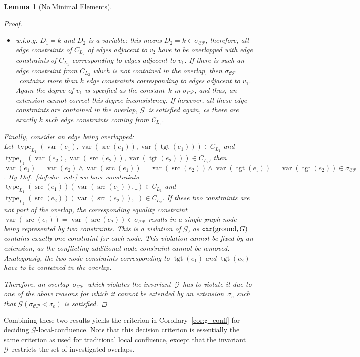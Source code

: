 \documentclass{tlp}
\newtheorem{lemma}[theorem]{Lemma}
\newcommand{\mcCP}{\ensuremath{\mathcal{CP}}}
\newcommand{\mcG}{\ensuremath{\mathcal{G}}}
\newcommand{\extend}{\ensuremath{\lhd}}
\newcommand{\sigcp}{\ensuremath{\sigma_{\mcCP}}}
\DeclareMathOperator{\var}{var}
\DeclareMathOperator{\type}{type}
\DeclareMathOperator{\src}{src}
\DeclareMathOperator{\tgt}{tgt}
\DeclareMathOperator{\gnd}{ground}
\newcommand{\chr}{\ensuremath{{\tt chr}}}
\begin{document}
\begin{lemma}[No Minimal Elements]
\begin{proof}
\begin{itemize}
  \item w.l.o.g. $D_1 = k$ and $D_2$ is a variable: this means $D_2 = k \in
  \sigcp$, therefore, all edge constraints of $C_{L_2}$ of edges adjacent to
  $v_2$ have to be overlapped with edge constraints of $C_{L_1}$ corresponding to
  edges adjacent to $v_1$. If there is such an edge constraint from $C_{L_2}$
  which is not contained in the overlap, then \sigcp\ contains more than $k$ edge
  constraints corresponding to edges adjacent to $v_1$. Again the degree of $v_1$
  is specified as the constant~$k$ in \sigcp, and thus, an extension cannot
  correct this degree inconsistency. If however, all these edge constraints are
  contained in the overlap, \mcG\ is satisfied again, as there are exactly $k$
  such edge constraints coming from $C_{L_1}$.
\end{itemize}

Finally, consider an edge being overlapped:\\
Let $\type_{L_1}(\var(e_1), \var(\src(e_1)), \var(\tgt(e_1))) \in C_{L_1}$ and\\
$\type_{L_2}(\var(e_2), \var(\src(e_2)), \var(\tgt(e_2))) \in C_{L_2}$, then\\
$\var(e_1) = \var(e_2) \land \var(\src(e_1)) = \var(\src(e_2)) \land
\var(\tgt(e_1)) = \var(\tgt(e_2)) \in \sigcp$. By Def.~\ref{def:chr_rule} we have
constraints $\type_{L_1}(\src(e_1))(\var(\src(e_1)), \_) \in C_{L_1}$ and
$\type_{L_2}(\src(e_2))(\var(\src(e_2)), \_) \in C_{L_2}$. If these two
constraints are not part of the overlap, the corresponding equality
constraint~$\var(\src(e_1))=\var(\src(e_2)) \in \sigcp$ results in a single graph
node being represented by two constraints. This is a violation of \mcG, as
$\chr(\gnd, G)$ contains exactly one constraint for each node. This violation
cannot be fixed by an extension, as the conflicting additional node constraint
cannot be removed. Analogously, the two node constraints corresponding to
$\tgt(e_1)$ and $\tgt(e_2)$ have to be contained in the overlap.

Therefore, an overlap~\sigcp\ which violates the invariant~\mcG\ has to violate
it due to one of the above reasons for which it cannot be extended by an
extension~$\sigma_e$ such that $\mcG(\sigcp \extend \sigma_e)$ is satisfied.
\end{proof}

\end{lemma}

Combining these two results yields the criterion in Corollary~\ref{cor:g_confl}
for deciding \mcG-local-confluence. Note that this decision criterion is
essentially the same criterion as used for traditional local confluence, except
that the invariant~\mcG\ restricts the set of investigated overlaps.
\end{document}
